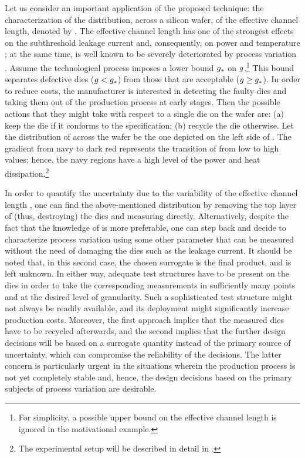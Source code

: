 Let us consider an important application of the proposed technique: the
characterization of the distribution, across a silicon wafer, of the effective
channel length, denoted by \g. The effective channel length has one of the
strongest effects on the subthreshold leakage current and, consequently, on
power and temperature \cite{juan2012}; at the same time, \g is well known to be
severely deteriorated by process variation \cite{chandrakasan2000,
srivastava2010}. Assume the technological process imposes a lower bound $g_*$
on $g$.\footnote{For simplicity, a possible upper bound on the effective
channel length is ignored in the motivational example.} This bound separates
defective dies ($g < g_*$) from those that are acceptable ($g \geq g_*$). In
order to reduce costs, the manufacturer is interested in detecting the faulty
dies and taking them out of the production process at early stages. Then the
possible actions that they might take with respect to a single die on the wafer
are: (a) keep the die if it conforms to the specification; (b) recycle the die
otherwise. Let the distribution of \g across the wafer be the one depicted on
the left side of . The gradient from navy to dark red represents
the transition of \g from low to high values; hence, the navy regions have a
high level of the power and heat dissipation.\footnote{The experimental setup
will be described in detail in .}

In order to quantify the uncertainty due to the variability of the effective
channel length \g, one can find the above-mentioned distribution by removing the
top layer of (thus, destroying) the dies and measuring \g directly.
Alternatively, despite the fact that the knowledge of \g is more preferable, one
can step back and decide to characterize process variation using some other
parameter that can be measured without the need of damaging the dies such as the
leakage current. It should be noted that, in this second case, the chosen
surrogate is the final product, and \g is left unknown. In either way, adequate
test structures have to be present on the dies in order to take the
corresponding measurements in sufficiently many points and at the desired level
of granularity. Such a sophisticated test structure might not always be readily
available, and its deployment might significantly increase production costs.
Moreover, the first approach implies that the measured dies have to be recycled
afterwards, and the second implies that the further design decisions will be
based on a surrogate quantity instead of the primary source of uncertainty,
which can compromise the reliability of the decisions. The latter concern is
particularly urgent in the situations wherein the production process is not yet
completely stable and, hence, the design decisions based on the primary subjects
of process variation are desirable.

